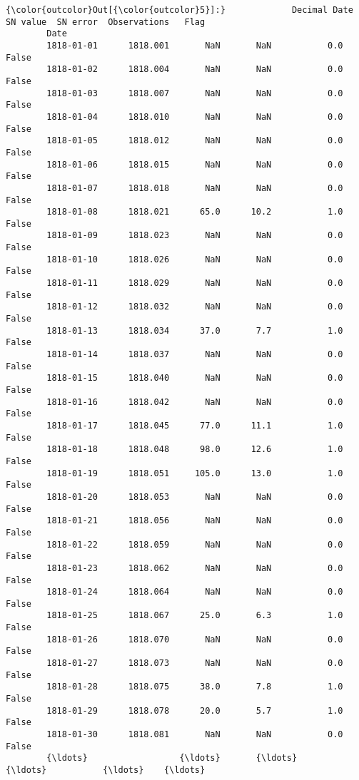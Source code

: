 \documentclass[11pt]{article}
\begin{document}
\begin{Verbatim}[commandchars=\\\{\}]
{\color{outcolor}Out[{\color{outcolor}5}]:}             Decimal Date  SN value  SN error  Observations   Flag
        Date                                                             
        1818-01-01      1818.001       NaN       NaN           0.0  False
        1818-01-02      1818.004       NaN       NaN           0.0  False
        1818-01-03      1818.007       NaN       NaN           0.0  False
        1818-01-04      1818.010       NaN       NaN           0.0  False
        1818-01-05      1818.012       NaN       NaN           0.0  False
        1818-01-06      1818.015       NaN       NaN           0.0  False
        1818-01-07      1818.018       NaN       NaN           0.0  False
        1818-01-08      1818.021      65.0      10.2           1.0  False
        1818-01-09      1818.023       NaN       NaN           0.0  False
        1818-01-10      1818.026       NaN       NaN           0.0  False
        1818-01-11      1818.029       NaN       NaN           0.0  False
        1818-01-12      1818.032       NaN       NaN           0.0  False
        1818-01-13      1818.034      37.0       7.7           1.0  False
        1818-01-14      1818.037       NaN       NaN           0.0  False
        1818-01-15      1818.040       NaN       NaN           0.0  False
        1818-01-16      1818.042       NaN       NaN           0.0  False
        1818-01-17      1818.045      77.0      11.1           1.0  False
        1818-01-18      1818.048      98.0      12.6           1.0  False
        1818-01-19      1818.051     105.0      13.0           1.0  False
        1818-01-20      1818.053       NaN       NaN           0.0  False
        1818-01-21      1818.056       NaN       NaN           0.0  False
        1818-01-22      1818.059       NaN       NaN           0.0  False
        1818-01-23      1818.062       NaN       NaN           0.0  False
        1818-01-24      1818.064       NaN       NaN           0.0  False
        1818-01-25      1818.067      25.0       6.3           1.0  False
        1818-01-26      1818.070       NaN       NaN           0.0  False
        1818-01-27      1818.073       NaN       NaN           0.0  False
        1818-01-28      1818.075      38.0       7.8           1.0  False
        1818-01-29      1818.078      20.0       5.7           1.0  False
        1818-01-30      1818.081       NaN       NaN           0.0  False
        {\ldots}                  {\ldots}       {\ldots}       {\ldots}           {\ldots}    {\ldots}

\end{Verbatim}
\end{document}
